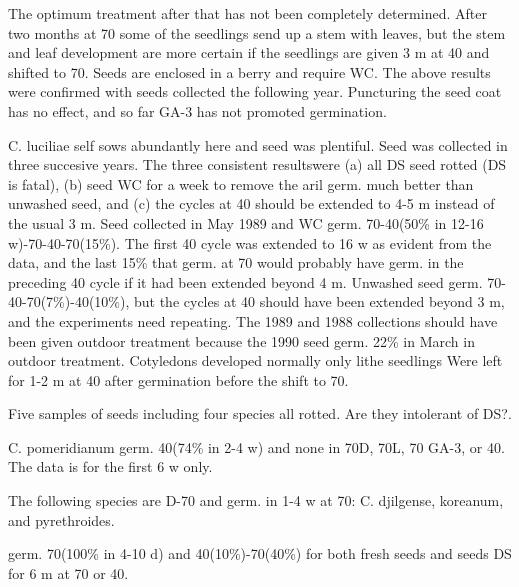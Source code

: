 \begin{description}
The optimum treatment after that has not been completely determined. After two
months at 70 some of the seedlings send up a stem with leaves, but the stem and leaf
development are more certain if the seedlings are given 3 m at 40 and shifted to 70.
Seeds are enclosed in a berry and require WC. The above results were confirmed
with seeds collected the following year. Puncturing the seed coat has no effect, and so
far GA-3 has not promoted germination.

\item [Chionodoxa (Liliaceae)] C. luciliae self sows abundantly here and seed
was plentiful. Seed was collected in three succesive years. The three consistent
resultswere (a) all DS seed rotted (DS is fatal), (b) seed WC for a week to remove the
aril germ. much better than unwashed seed, and (c) the cycles at 40 should be
extended to 4-5 m instead of the usual 3 m. Seed collected in May 1989 and WC
germ. 70-40(50\% in 12-16 w)-70-40-70(15\%). The first 40 cycle was extended to 16 w
as evident from the data, and the last 15\% that germ. at 70 would probably have germ.
in the preceding 40 cycle if it had been extended beyond 4 m. Unwashed seed germ.
70-40-70(7\%)-40(10\%), but the cycles at 40 should have been extended beyond 3 m,
and the experiments need repeating. The 1989 and 1988 collections should have
been given outdoor treatment because the 1990 seed germ. 22\% in March in outdoor
treatment. Cotyledons developed normally only lithe seedlings Were left for 1-2 m at
40 after germination before the shift to 70.

\item [Chioranthus (Chloranthaceae)] Five samples of seeds including four
species all rotted. Are they intolerant of DS?.
\item [Chiorogalum (Liliaceae)] C. pomeridianum germ. 40(74\% in 2-4 w) and
none in 70D, 70L, 70 GA-3, or 40. The data is for the first 6 w only.
\item [Chrysanthemum (Asteraceae)] The following species are D-70 and germ.
in 1-4 w at 70: C. djilgense, koreanum, and pyrethroides.
\item [C. leucanthemum] germ. 70(100\% in 4-10 d) and 40(10\%)-70(40\%) for both
fresh seeds and seeds DS for 6 m at 70 or 40.


\end{description}
